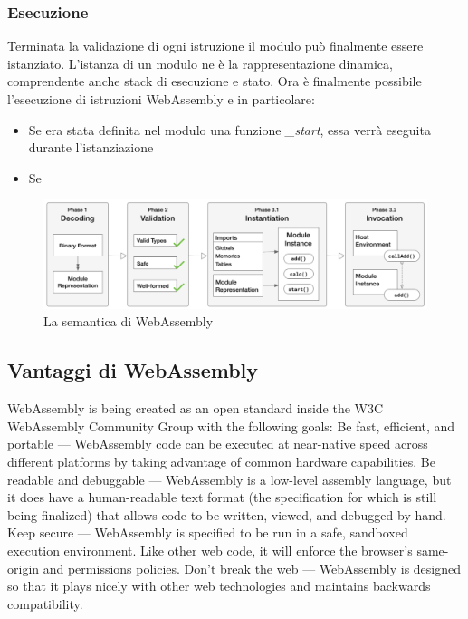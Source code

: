 \subsubsection{Esecuzione}
Terminata la validazione di ogni istruzione il modulo può finalmente essere istanziato.
L'istanza di un modulo ne è la rappresentazione dinamica, comprendente anche stack di esecuzione e stato. 
Ora è finalmente possibile l'esecuzione di istruzioni WebAssembly e in particolare:
\begin{itemize}
        \item Se era stata definita nel modulo una funzione \emph{\_start}, essa verrà eseguita durante l'istanziazione
        \item Se 
\end{itemize}
\begin{figure}
        \begin{center}
                \includegraphics[width=0.97\columnwidth]{images/wasmSemanticPhases.png}
        \end{center}
        \caption{La semantica di WebAssembly}
        \label{fig:wasmPhases}
\end{figure}

\newpage
\subsection{Vantaggi di WebAssembly}
WebAssembly is being created as an open standard inside the W3C WebAssembly Community Group with the following goals:
Be fast, efficient, and portable — WebAssembly code can be executed at near-native speed across different platforms by taking advantage of common hardware capabilities.
Be readable and debuggable — WebAssembly is a low-level assembly language, but it does have a human-readable text format (the specification for which is still being finalized) that allows code to be written, viewed, and debugged by hand.
Keep secure — WebAssembly is specified to be run in a safe, sandboxed execution environment. Like other web code, it will enforce the browser's same-origin and permissions policies.
Don't break the web — WebAssembly is designed so that it plays nicely with other web technologies and maintains backwards compatibility.


